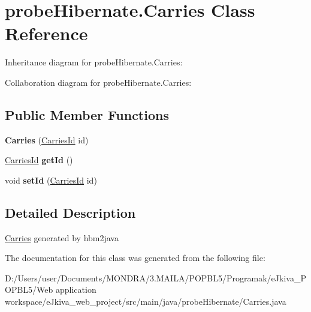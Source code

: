 \hypertarget{classprobe_hibernate_1_1_carries}{}\section{probe\+Hibernate.\+Carries Class Reference}
\label{classprobe_hibernate_1_1_carries}


Inheritance diagram for probe\+Hibernate.\+Carries\+:


Collaboration diagram for probe\+Hibernate.\+Carries\+:
\subsection*{Public Member Functions}
\begin{DoxyCompactItemize}
\item 
\mbox{\label{classprobe_hibernate_1_1_carries_a574489e0194deafb937a558c67d33c53}} 
{\bfseries Carries} (\mbox{\hyperlink{classprobe_hibernate_1_1_carries_id}{Carries\+Id}} id)
\item 
\mbox{\label{classprobe_hibernate_1_1_carries_abe3f3f8687a7c3a3ee3b16047497b151}} 
\mbox{\hyperlink{classprobe_hibernate_1_1_carries_id}{Carries\+Id}} {\bfseries get\+Id} ()
\item 
\mbox{\label{classprobe_hibernate_1_1_carries_aba1509c2d6821b5e4d51d2a70afff4f5}} 
void {\bfseries set\+Id} (\mbox{\hyperlink{classprobe_hibernate_1_1_carries_id}{Carries\+Id}} id)
\end{DoxyCompactItemize}


\subsection{Detailed Description}
\mbox{\hyperlink{classprobe_hibernate_1_1_carries}{Carries}} generated by hbm2java 

The documentation for this class was generated from the following file\+:\begin{DoxyCompactItemize}
\item 
D\+:/\+Users/user/\+Documents/\+M\+O\+N\+D\+R\+A/3.\+M\+A\+I\+L\+A/\+P\+O\+P\+B\+L5/\+Programak/e\+Jkiva\+\_\+\+P\+O\+P\+B\+L5/\+Web application workspace/e\+Jkiva\+\_\+web\+\_\+project/src/main/java/probe\+Hibernate/Carries.\+java\end{DoxyCompactItemize}
